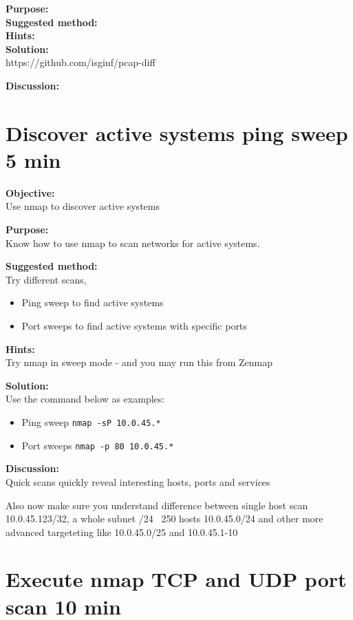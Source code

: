 \documentclass[a4paper,11pt,notitlepage]{report}
\begin{document}
{\bf Purpose:}\\


{\bf Suggested method:}\\


{\bf Hints:}\\


{\bf Solution:}\\


https://github.com/isginf/pcap-diff​

{\bf Discussion:}\\


\chapter{Discover active systems ping sweep 5 min}
\label{ex:nmap-pingsweep}

{\bf Objective:}\\
Use nmap to discover active systems

{\bf Purpose:}\\
Know how to use nmap to scan networks for active systems.

{\bf Suggested method:}\\
Try different scans,
\begin{itemize}
\item Ping sweep to find active systems
\item Port sweeps to find active systems with specific ports
\end{itemize}

{\bf Hints:} \\
Try nmap in sweep mode - and you may run this from Zenmap

{\bf Solution:}\\
Use the command below as examples:
\begin{itemize}
\item Ping sweep \verb+nmap -sP 10.0.45.*+
\item Port sweeps \verb+nmap -p 80 10.0.45.*+
\end{itemize}

{\bf Discussion:}\\
Quick scans quickly reveal interesting hosts, ports and services

Also now make sure you understand difference between single host scan
10.0.45.123/32, a whole subnet /24 ~250 hosts 10.0.45.0/24 and other more advanced targeteting like 10.0.45.0/25 and 10.0.45.1-10


\chapter{Execute nmap TCP and UDP port scan 10 min}
\label{ex:nmap-synscan}
\end{document}
